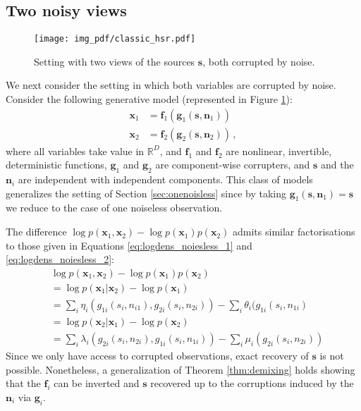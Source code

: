 \subsection{Two noisy views}
\label{sec:constrained}

\begin{figure}[t!]
	\centering
	\texttt{[image: img\_pdf/classic\_hsr.pdf]}
	\caption{Setting with two views of the sources $\bm{s}$, both corrupted by noise.}
	\label{fig:classic_hsr}
\end{figure}

We next consider the setting in which both variables are corrupted by noise.
Consider the following generative model (represented in Figure \ref{fig:classic_hsr}):
\begin{align*}
\bm{x}_{1}&=\bm{f}_{1}(\bm{g}_{1}(\bm{s},\bm{n}_{1}))  \\
\bm{x}_{2}&=\bm{f}_{2}(\bm{g}_{2}(\bm{s},\bm{n}_{2}))  \,,
\end{align*}
where all variables take value in $\mathbb{R}^D$, and $\bm{f}_{1}$ and $\bm{f}_{2}$ are nonlinear, invertible, deterministic functions,
$\bm{g}_{1}$ and $\bm{g}_{2}$ are component-wise corrupters, and $\bm{s}$ and the $\bm{n}_i$ are independent with independent components.
This class of models generalizes the setting of Section \ref{sec:onenoisless} since by taking $\bm{g}_1(\bm{s}, \bm{n}_1) = \bm{s}$ we reduce to the case of one noiseless observation.

The difference $\log p(\bm{x}_1, \bm{x}_2) - \log p(\bm{x}_1)p(\bm{x}_2)$ admits similar factorisations to those given in Equations \ref{eq:logdens_noiesless_1} and \ref{eq:logdens_noiesless_2}:
\begin{align}
&\log p(\bm{x}_1, \bm{x}_2) - \log p(\bm{x}_1) p(\bm{x}_2) \nonumber\\
&= \log p(\bm{x}_1 | \bm{x}_2) - \log p(\bm{x}_1)\nonumber\\
&= \sum_i \eta_i(g_{1i}(s_i, n_{i1}), g_{2i}(s_i, n_{2i})) - \sum_i \theta_i(g_{1i}(s_i, n_{1i}) \label{eq:noisylogdens_1}\\
&= \log p(\bm{x}_2 | \bm{x}_1) - \log p(\bm{x}_2) \nonumber\\
&= \sum_i \lambda_i(g_{2i}(s_i, n_{2i}), g_{1i}(s_i, n_{1i})) - \sum_i \mu_i(g_{2i}(s_i, n_{2i})) \label{eq:noisylogdens_2}
\end{align}
Since we only have access to corrupted observations, exact recovery of $\bm{s}$ is not possible.
Nonetheless, a generalization of Theorem \ref{thm:demixing} holds showing that the $\bm{f}_i$ can be inverted and $\bm{s}$ recovered up to the corruptions induced by the $\bm{n}_i$ via $\bm{g}_i$.

